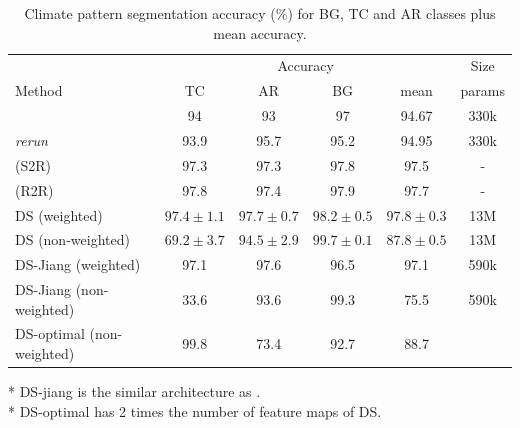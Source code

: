 \documentclass{article} %
\begin{document}
\begin{table}

\begin{tabular}{l|c c c c c}
        \multicolumn{1}{l}{} & \multicolumn{4}{c}{Accuracy} & Size\\
        \cmidrule(lr){2-5} \cmidrule(lr){6-6}
        \multicolumn{1}{l}{Method} & TC & AR & BG & mean & params \\ \hline
        \cite{jiang_spherical_2019} & 94 & 93 & 97 & 94.67 & 330k\\
        \cite{jiang_spherical_2019} \emph{rerun} & 93.9 & 95.7 & 95.2 & 94.95 & 330k\\
        \cite{cohen_gauge_2019} (S2R) & 97.3 & 97.3 & 97.8 & 97.5 & -\\
        \cite{cohen_gauge_2019} (R2R) & 97.8 & 97.4 & 97.9 & 97.7 & -\\ \hline
        DS (weighted) & $97.4\pm 1.1$ & $97.7\pm 0.7$ & $98.2\pm 0.5$ & $97.8\pm 0.3$ & 13M\\
        DS (non-weighted) & $69.2\pm 3.7$ & $94.5\pm 2.9$ & $99.7\pm 0.1$ & $87.8\pm 0.5$ & 13M\\ \hline
        DS-Jiang (weighted) & 97.1 & 97.6 & 96.5 & 97.1 & 590k\\
        DS-Jiang (non-weighted) & 33.6 & 93.6 & 99.3 & 75.5 & 590k\\ \hline
        DS-optimal (non-weighted) & 99.8 & 73.4 & 92.7 & 88.7 & \\ \hline
    \end{tabular}
    \caption{Climate pattern segmentation accuracy (\%) for BG, TC
and AR classes plus mean accuracy.}
\end{table}

* DS-jiang is the similar architecture as \cite{jiang_spherical_2019}.\\
* DS-optimal has 2 times the number of feature maps of DS.\\
\end{document}
